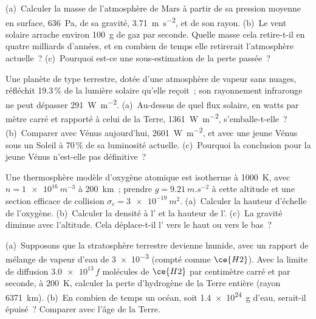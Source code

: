 \begin{exercise}[$\star\star$]\label{exo:b3:planetary-atmospheres:8}
(a)~Calculer la masse de l'atmosphère de Mars à partir de sa pression
moyenne en surface, \qty{636}{Pa}, de sa gravité, \qty{3.71}{m.s^{-2}}, et de son
rayon. (b)~Le vent solaire arrache environ \qty{100}{g} de gaz par seconde.
Quelle masse cela retire-t-il en quatre milliards d'années, et en combien de temps
elle retirerait l'atmosphère actuelle~? (c)~Pourquoi est-ce une sous-estimation de la
perte passée~?
\end{exercise}

\begin{exercise}[$\star\star$]\label{exo:b3:planetary-atmospheres:9}
Une planète de type terrestre, dotée d'une atmosphère de vapeur sans nuages, réfléchit 19.3\,\%
de la lumière solaire qu'elle reçoit~; son rayonnement infrarouge ne peut dépasser
\qty{291}{W.m^{-2}}. (a)~Au-dessus de quel flux solaire, en watts par mètre carré
et rapporté à celui de la Terre, \qty{1361}{W.m^{-2}}, s'emballe-t-elle~?
(b)~Comparer avec Vénus aujourd'hui, \qty{2601}{W.m^{-2}}, et avec une jeune Vénus
sous un Soleil à 70\,\% de sa luminosité actuelle. (c)~Pourquoi la
conclusion pour la jeune Vénus n'est-elle pas définitive~?
\end{exercise}

\begin{exercise}[$\star\star\star$]\label{exo:b3:planetary-atmospheres:10}
Une thermosphère modèle d'oxygène atomique est isotherme à \qty{1000}{K}, avec
$n = \qty{1e16}{m^{-3}}$ à \qty{200}{km}~; prendre $g =
\qty{9.21}{m.s^{-2}}$ à cette altitude et une section efficace de collision
$\sigma_c = \qty{3e-19}{m^2}$. (a)~Calculer la hauteur d'échelle de l'oxygène.
(b)~Calculer la densité à l' et la hauteur de l'.
(c)~La gravité diminue avec l'altitude. Cela déplace-t-il l' vers le haut ou
vers le bas~?
\end{exercise}

\begin{exercise}[$\star\star\star$]\label{exo:b3:planetary-atmospheres:11}
(a)~Supposons que la stratosphère terrestre devienne humide, avec un rapport de mélange
de vapeur d'eau de \num{3e-3} (compté comme $\ce{H2}$). Avec la limite
de diffusion $\num{3.0e13}\,f$ molécules de $\ce{H2}$ par centimètre carré et
par seconde, à \qty{200}{K}, calculer la perte d'hydrogène de la Terre
entière (rayon \qty{6371}{km}). (b)~En combien de temps un océan,
soit \qty{1.4e24}{g} d'eau, serait-il épuisé~? Comparer avec l'âge de la Terre.
\end{exercise}

